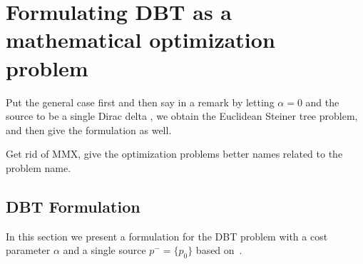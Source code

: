 \documentclass[11pt,reqno,a4paper]{amsart}
\numberwithin{equation}{section}
\theoremstyle{mytheorem}
\theoremstyle{myremark}
\theoremstyle{myparagraph}
\begin{document}
    \section{Formulating DBT as a mathematical optimization problem}

    {\color{red} Put the general case first and then say in a remark by letting $\alpha = 0$ and the source to be a single Dirac delta
        , we obtain the Euclidean Steiner tree problem, and then give the formulation as well.}


    {\color{red} Get rid of MMX, give the optimization problems better names related to the problem name.}

    \subsection{DBT Formulation}

    In this section we present a formulation for the DBT problem with a cost parameter $\alpha$ and a
    single source $p^-=\{p_0\}$ based on~\cite[MMX]{mmx}.
\end{document}
